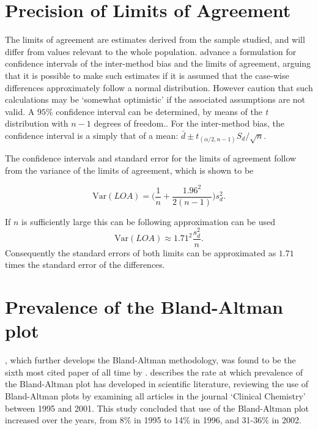 \documentclass[12pt, a4paper]{report}
\theoremstyle{plain}
\theoremstyle{definition}
\theoremstyle{remark}
\begin{document}
\section{Precision of Limits of Agreement}

	The limits of agreement are estimates derived from the sample studied, and will differ from values relevant to the whole
	population. \citet*{BA86} advance a formulation for confidence
	intervals of the inter-method bias and the limits of agreement, arguing that it is possible to make such estimates if it is assumed that the case-wise differences approximately follow a normal distribution. However \citet*{BA99} caution that such calculations may be `somewhat
	optimistic' if the associated assumptions are not valid. A $95\%$ confidence interval can be determined, by means of the
	\emph{t} distribution with $n-1$ degrees of freedom.. For the inter-method bias, the confidence interval is a simply that of a mean: $\bar{d} \pm t_{(\alpha/2,n-1)} S_{d}/\sqrt{n}$.
	
	The confidence intervals and standard error for the limits of agreement follow from the variance of the limits of agreement, which is shown to be
	
	\[
	\mbox{Var}(LOA) = \bigg(\frac{1}{n}+\frac{1.96^{2}}{2(n-1)}\bigg)s_{d}^{2}.
	\]
	
	If $n$ is sufficiently large this can be following approximation can be used
	\[
	\mbox{Var}(LOA) \approx 1.71^{2}\frac{s_{d}^{2}}{n}.
	\]
	Consequently the standard errors of both limits can be approximated as $1.71$ times the standard error of the differences.
	


 


		


\section{Prevalence of the Bland-Altman plot}

\citet*{BA86}, which further develops the Bland-Altman methodology,
was found to be the sixth most cited paper of all time by \citet{BAcite}. \cite{Dewitte} describes the rate at which
prevalence of the Bland-Altman plot has developed in scientific
literature, reviewing the use of Bland-Altman plots
by examining all articles in the journal `Clinical Chemistry'
between 1995 and 2001. This study concluded that use of the
Bland-Altman plot increased over the years, from 8\% in 1995 to
14\% in 1996, and 31-36\% in 2002.
\end{document}
